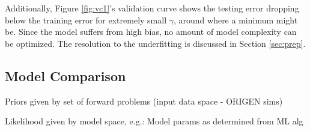 Additionally, Figure \ref{fig:vc1}'s validation curve shows the testing error
dropping below the training error for extremely small $\gamma$, around where a
minimum might be.  Since the model suffers from high bias, no amount of model
complexity can be optimized. The resolution to the underfitting is discussed in
Section \ref{sec:prep}.

\subsection{Model Comparison}
\label{sec:algcompare}

Priors given by set of forward problems (input data space - ORIGEN sims)

Likelihood given by model space, e.g.: Model params as determined from ML alg

